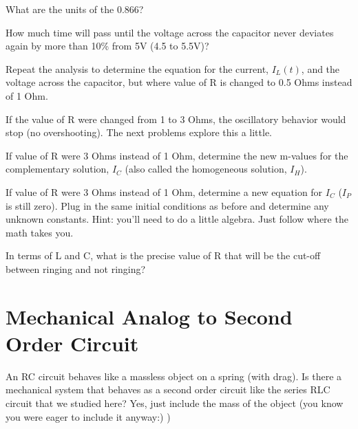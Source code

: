 \begin{alevel}
What are the units of the 0.866?
\end{alevel}

\begin{dlevel}
How much time will pass until the voltage across the capacitor never deviates again by more than 10\% from 5V (4.5 to 5.5V)?
\end{dlevel}

\begin{clevel}
Repeat the analysis to determine the equation for the current, $I_L(t)$, and the voltage across the capacitor, but where value of R is changed to 0.5 Ohms instead of 1 Ohm. 
\end{clevel}

If the value of R were changed from 1 to 3 Ohms, the oscillatory behavior would stop (no overshooting). The next problems explore this a little.

\begin{clevel}
If value of R were 3 Ohms instead of 1 Ohm, determine the new m-values for the complementary solution, $I_C$ (also called the homogeneous solution, $I_H$).
\end{clevel}

\begin{clevel}
If value of R were 3 Ohms instead of 1 Ohm, determine a new equation for $I_C$ ($I_P$ is still zero). Plug in the same initial conditions as before and determine any unknown constants. Hint: you'll need to do a little algebra. Just follow where the math takes you.
\end{clevel}

\begin{clevel}
In terms of L and C, what is the precise value of R that will be the cut-off between ringing and not ringing?
\end{clevel}

\section{Mechanical Analog to Second Order Circuit}
An RC circuit behaves like a massless object on a spring (with drag). Is there a mechanical system that behaves as a second order circuit like the series RLC circuit that we studied here? Yes, just include the mass of the object (you know you were eager to include it anyway:) ) 

